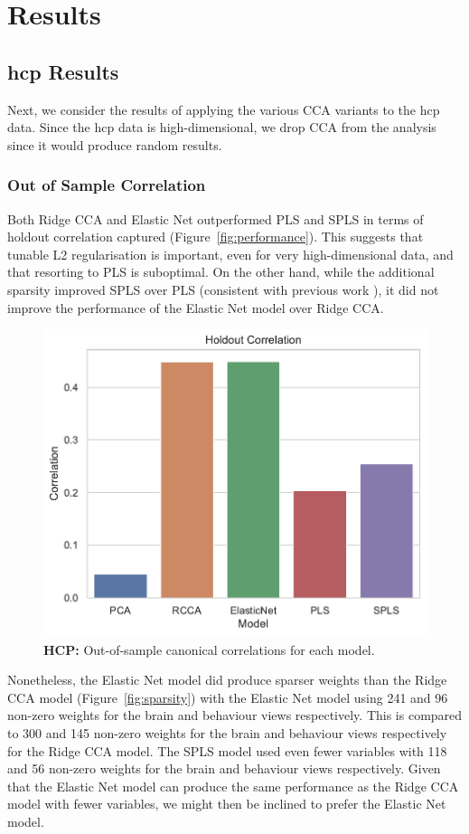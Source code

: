 \section{Results}

\subsection{\acrshort{hcp} Results}

Next, we consider the results of applying the various CCA variants to the \acrshort{hcp} data.
Since the \acrshort{hcp} data is high-dimensional, we drop CCA from the analysis since it would produce random results.

\subsubsection{Out of Sample Correlation}

Both Ridge CCA and Elastic Net outperformed PLS and SPLS in terms of holdout correlation captured (Figure~\ref{fig:performance}).
This suggests that tunable L2 regularisation is important, even for very high-dimensional data, and that resorting to PLS is suboptimal.
On the other hand, while the additional sparsity improved SPLS over PLS (consistent with previous work \cite{monteiro2016multiple}), it did not improve the performance of the Elastic Net model over Ridge CCA\@.

\begin{figure}[h]
    \centering
    \includegraphics[width=0.5\linewidth]{figures/hcp/holdout_correlations}
    \caption{\textbf{HCP:} Out-of-sample canonical correlations for each model.}
\end{figure}

Nonetheless, the Elastic Net model did produce sparser weights than the Ridge CCA model (Figure~\ref{fig:sparsity}) with the Elastic Net model using 241 and 96 non-zero weights for the brain and behaviour views respectively.
This is compared to 300 and 145 non-zero weights for the brain and behaviour views respectively for the Ridge CCA model.
The SPLS model used even fewer variables with 118 and 56 non-zero weights for the brain and behaviour views respectively.
Given that the Elastic Net model can produce the same performance as the Ridge CCA model with fewer variables, we might then be inclined to prefer the Elastic Net model.


